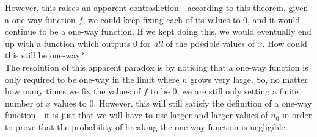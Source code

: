 However, this raises an apparent contradiction - according to this theorem, given a one-way function $f$, we could keep fixing each of its values to $0$, and it would continue to be a one-way function.  If we kept doing this, we would eventually end up with a function which outputs 0 for {\em all} of the possible values of $x$.  How could this still be one-way?\\

The resolution of this apparent paradox is by noticing that a one-way function is only required to be one-way in the limit where $n$ grows very large.  So, no matter how many times we fix the values of $f$ to be 0, we are still only setting a finite number of $x$ values to 0.  However, this will still satisfy the definition of a one-way function - it is just that we will have to use larger and larger values of $n_0$ in order to prove that the probability of breaking the one-way function is negligible.

